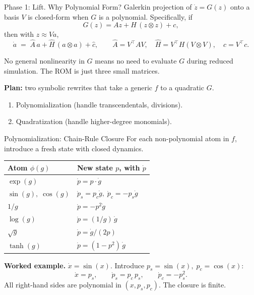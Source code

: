 \documentclass[aspectratio=169,10pt]{beamer}
\begin{document}

\begin{frame}{Phase 1: Lift. Why Polynomial Form?}
  Galerkin projection of $\dot{z} = G(z)$ onto a basis $V$ is closed-form when $G$ is a polynomial. Specifically, if
  \[
    G(z) = A z + H \, (z \otimes z) + c,
  \]
  then with $z \approx V a$,
  \[
    \dot{a} \;=\; \widehat{A}\, a + \widehat{H}\, (a \otimes a) + \widehat{c},
    \qquad
    \widehat{A} = V^{\top} A V, \quad
    \widehat{H} = V^{\top} H (V \otimes V), \quad
    \widehat{c} = V^{\top} c.
  \]

  \medskip
  No general nonlinearity in $G$ means no need to evaluate $G$ during reduced simulation. The ROM is just three small matrices.

  \medskip
  \textbf{Plan:} two symbolic rewrites that take a generic $f$ to a quadratic $G$.
  \begin{enumerate}
    \item Polynomialization (handle transcendentals, divisions).
    \item Quadratization (handle higher-degree monomials).
  \end{enumerate}
\end{frame}

\begin{frame}{Polynomialization: Chain-Rule Closure}
  For each non-polynomial atom in $f$, introduce a fresh state with closed dynamics.

  \medskip
  \begin{tabular}{ll}
    \toprule
    Atom $\phi(g)$ & New state $p$, with $\dot{p}$ \\
    \midrule
    $\exp(g)$            & $\dot{p} = p \cdot \dot{g}$ \\
    $\sin(g),\; \cos(g)$ & $\dot{p}_s = p_c \dot{g},\; \dot{p}_c = -p_s \dot{g}$ \\
    $1/g$                & $\dot{p} = -p^2 \dot{g}$ \\
    $\log(g)$            & $\dot{p} = (1/g)\, \dot{g}$ \\
    $\sqrt{g}$           & $\dot{p} = \dot{g} / (2 p)$ \\
    $\tanh(g)$           & $\dot{p} = (1 - p^2)\, \dot{g}$ \\
    \bottomrule
  \end{tabular}

  \medskip
  \textbf{Worked example.} $\dot{x} = \sin(x)$.
  Introduce $p_s = \sin(x),\; p_c = \cos(x)$:
  \[
    \dot{x} = p_s, \qquad
    \dot{p}_s = p_c\, p_s, \qquad
    \dot{p}_c = -p_s^2.
  \]
  All right-hand sides are polynomial in $(x, p_s, p_c)$. The closure is finite.
\end{frame}
\end{document}
